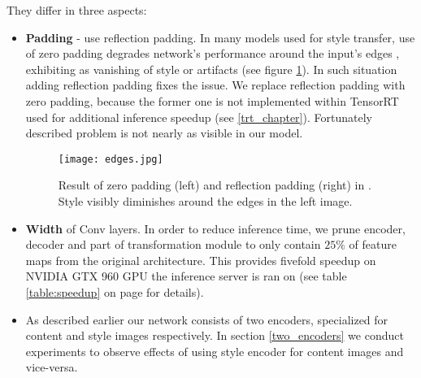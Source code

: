 \documentclass[../Main.tex]{subfiles}
\begin{document}
    They differ in three aspects:
    \begin{itemize}
        \item \textbf{Padding} - \cite{Li2018} use reflection padding. In many
        models used for style transfer, use of zero padding degrades network's
        performance around the input's edges \cite{johnson2016perceptual}, exhibiting as
        vanishing of style or artifacts (see figure \ref{fig:edges}).
        In such situation adding reflection padding fixes the issue. We replace
        reflection padding with zero padding, because the former one is not 
        implemented within TensorRT used for additional inference speedup
        (see \ref{trt_chapter}). Fortunately described problem is not nearly as visible
        in our model.
        \begin{figure}[h!]
            \texttt{[image: edges.jpg]}
            \caption{Result of zero padding (left) and reflection padding (right)
                in \cite{johnson2016perceptual}. Style visibly diminishes around
                the edges in the left image.
            }
            \label{fig:edges}
        \end{figure}
        \item \textbf{Width} of Conv layers. In order to reduce inference time,
        we prune encoder, decoder and part of transformation module
        to only contain $25\%$ of feature maps from the original architecture.
        This provides 
        fivefold speedup on NVIDIA GTX 960 GPU the inference server is ran on 
        (see table \ref{table:speedup} on page \pageref{table:speedup} for details).
        \item As described earlier our network consists of two encoders, specialized
        for content and style images respectively. In section \ref{two_encoders}
        we conduct experiments to observe effects of using style encoder for 
        content images and vice-versa.
        
    \end{itemize}
\end{document}
